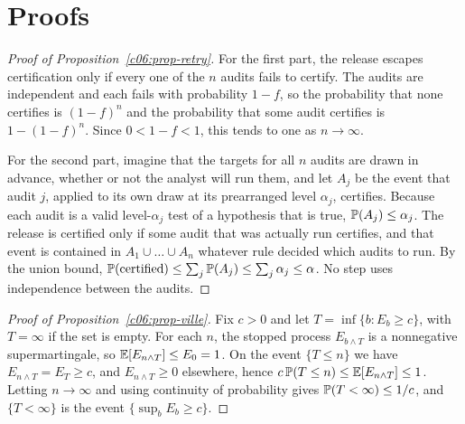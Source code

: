 \section{Proofs}\label{c06:sec-proofs}

\begin{proof}[Proof of Proposition~\ref{c06:prop-retry}]
For the first part, the release escapes certification only if every one of the $n$
audits fails to certify. The audits are independent and each fails with
probability $1-f$, so the probability that none certifies is $(1-f)^n$ and the
probability that some audit certifies is $1-(1-f)^n$. Since $0 < 1-f < 1$, this
tends to one as $n \to \infty$.

For the second part, imagine that the targets for all $n$ audits are drawn in
advance, whether or not the analyst will run them, and let $A_j$ be the event that
audit $j$, applied to its own draw at its prearranged level $\alpha_j$, certifies.
Because each audit is a valid level-$\alpha_j$ test of a hypothesis that is true,
$\mathbb{P}(A_j) \le \alpha_j$. The release is certified only if some audit that was
actually run certifies, and that event is contained in $A_1 \cup \dots \cup A_n$
whatever rule decided which audits to run. By the union bound,
$\mathbb{P}(\text{certified}) \le \sum_j \mathbb{P}(A_j) \le \sum_j \alpha_j \le \alpha$. No
step uses independence between the audits.
\end{proof}

\begin{proof}[Proof of Proposition~\ref{c06:prop-ville}]
Fix $c > 0$ and let $T = \inf\{b : E_b \ge c\}$, with $T = \infty$ if the set is
empty. For each $n$, the stopped process $E_{b \wedge T}$ is a nonnegative
supermartingale, so $\mathbb{E}[E_{n \wedge T}] \le E_0 = 1$. On the event $\{T \le n\}$ we
have $E_{n \wedge T} = E_T \ge c$, and $E_{n \wedge T} \ge 0$ elsewhere, hence
$c\,\mathbb{P}(T \le n) \le \mathbb{E}[E_{n \wedge T}] \le 1$. Letting $n \to \infty$ and using
continuity of probability gives $\mathbb{P}(T < \infty) \le 1/c$, and $\{T < \infty\}$
is the event $\{\sup_b E_b \ge c\}$.
\end{proof}

